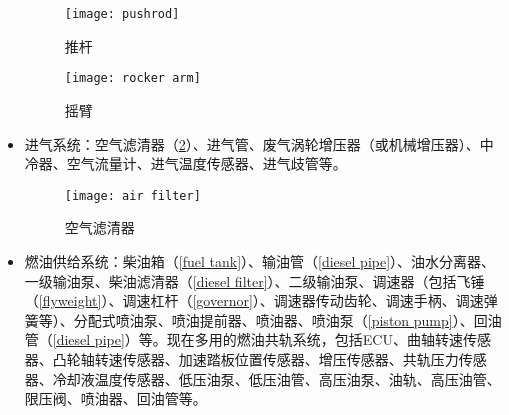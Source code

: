 \documentclass[UTF8]{ctexart}
\numberwithin{figure}{section}
\numberwithin{table}{section}
\begin{document}
\begin{itemize}
	      \begin{figure}[htbp]
		      \centering
		      \begin{minipage}[b]{0.7\textwidth}
			      \centering
			      \texttt{[image: pushrod]}
			      \caption{推杆}
			      \label{pushrod}
		      \end{minipage}
		      \begin{minipage}[b]{0.2\textwidth}
			      \centering
			      \texttt{[image: rocker arm]}
			      \caption{摇臂}
			      \label{rocker arm}
		      \end{minipage}
	      \end{figure}

	\item 进气系统：空气滤清器（\cref{air filter}）、进气管、废气涡轮增压器（或机械增压器）、中冷器、空气流量计、进气温度传感器、进气歧管等。

	      \begin{figure}[htbp]
		      \centering
		      \begin{minipage}[b]{0.4\textwidth}
			      \centering
			      \texttt{[image: air filter]}
			      \caption{空气滤清器}
			      \label{air filter}
		      \end{minipage}
	      \end{figure}

	\item 燃油供给系统：柴油箱（\cref{fuel tank}）、输油管（\cref{diesel pipe}）、油水分离器、一级输油泵、柴油滤清器（\cref{diesel filter}）、二级输油泵、调速器（包括飞锤（\cref{flyweight}）、调速杠杆（\cref{governor}）、调速器传动齿轮、调速手柄、调速弹簧等）、分配式喷油泵、喷油提前器、喷油器、喷油泵（\cref{piston pump}）、回油管（\cref{diesel pipe}）等。现在多用的燃油共轨系统，包括ECU、曲轴转速传感器、凸轮轴转速传感器、加速踏板位置传感器、增压传感器、共轨压力传感器、冷却液温度传感器、低压油泵、低压油管、高压油泵、油轨、高压油管、限压阀、喷油器、回油管等。


\end{itemize}
\end{document}
